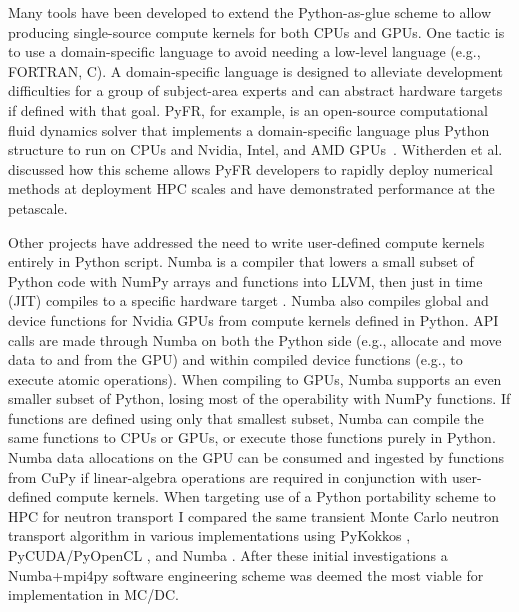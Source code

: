 Many tools have been developed to extend the Python-as-glue scheme to allow producing single-source compute kernels for both CPUs and GPUs.
One tactic is to use a domain-specific language to avoid needing a low-level language (e.g., FORTRAN, C).
A domain-specific language is designed to alleviate development difficulties for a group of subject-area experts and can abstract hardware targets if defined with that goal.
PyFR, for example, is an open-source computational fluid dynamics solver that implements a domain-specific language plus Python structure to run on CPUs and Nvidia, Intel, and AMD GPUs~\cite{pyfrPetascale}. 
Witherden et al.~\cite{pyfrPetascale} discussed how this scheme allows PyFR developers to rapidly deploy numerical methods at deployment HPC scales and have demonstrated performance at the petascale.

Other projects have addressed the need to write user-defined compute kernels entirely in Python script.
Numba is a compiler that lowers a small subset of Python code with NumPy arrays and functions into LLVM, then just in time (JIT) compiles to a specific hardware target \cite{lam_numba_2015}. 
Numba also compiles global and device functions for Nvidia GPUs from compute kernels defined in Python.
API calls are made through Numba on both the Python side (e.g., allocate and move data to and from the GPU) and within compiled device functions (e.g., to execute atomic operations).
When compiling to GPUs, Numba supports an even smaller subset of Python, losing most of the operability with NumPy functions.
If functions are defined using only that smallest subset, Numba can compile the same functions to CPUs or GPUs, or execute those functions purely in Python.
Numba data allocations on the GPU can be consumed and ingested by functions from CuPy if linear-algebra operations are required in conjunction with user-defined compute kernels.
When targeting use of a Python portability scheme to HPC for neutron transport I compared the same transient Monte Carlo neutron transport algorithm in various implementations using PyKokkos \cite{AlAwarETAL21PyKokkos}, PyCUDA/PyOpenCL \cite{kloeckner_pycuda_2012}, and Numba \cite{morgan2022}.
After these initial investigations a Numba+mpi4py software engineering scheme was deemed the most viable for implementation in MC/DC.



